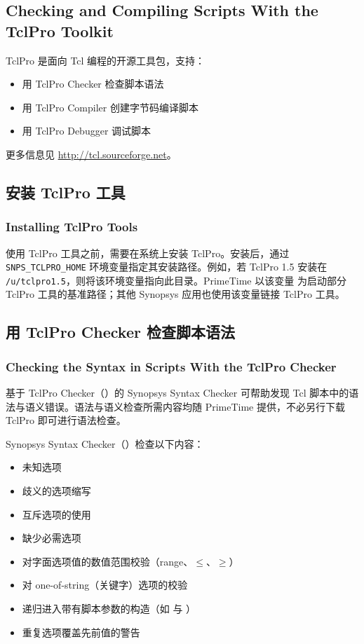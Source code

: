 \subsection*{Checking and Compiling Scripts With the TclPro Toolkit}

TclPro 是面向 Tcl 编程的开源工具包，支持：
\begin{itemize}
  \item 用 TclPro Checker 检查脚本语法
  \item 用 TclPro Compiler 创建字节码编译脚本
  \item 用 TclPro Debugger 调试脚本
\end{itemize}
更多信息见 \url{http://tcl.sourceforge.net}。

\subsection{安装 TclPro 工具}
\subsubsection*{Installing TclPro Tools}

使用 TclPro 工具之前，需要在系统上安装 TclPro。安装后，通过
\texttt{SNPS\_TCLPRO\_HOME} 环境变量指定其安装路径。例如，若 TclPro 1.5
安装在 \texttt{/u/tclpro1.5}，则将该环境变量指向此目录。PrimeTime 以该变量
为启动部分 TclPro 工具的基准路径；其他 Synopsys 应用也使用该变量链接 TclPro 工具。

\subsection{用 TclPro Checker 检查脚本语法}
\subsubsection*{Checking the Syntax in Scripts With the TclPro Checker}

基于 TclPro Checker（）的 Synopsys Syntax Checker 可帮助发现 Tcl 脚本中的语法与语义错误。语法与语义检查所需内容均随 PrimeTime 提供，不必另行下载 TclPro 即可进行语法检查。

Synopsys Syntax Checker（）检查以下内容：
\begin{itemize}
  \item 未知选项
  \item 歧义的选项缩写
  \item 互斥选项的使用
  \item 缺少必需选项
  \item 对字面选项值的数值范围校验（range、$\leq$、$\geq$）
  \item 对 one-of-string（关键字）选项的校验
  \item 递归进入带有脚本参数的构造（如  与 ）
  \item 重复选项覆盖先前值的警告
\end{itemize}

